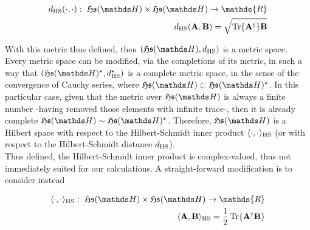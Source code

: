 \documentclass{homework}
\begin{document}
\begin{equation*}
\begin{split}
   d_{\textnormal{HS}}(\cdot, \cdot): \blanky \mathfrak{H}\mathfrak{s}(\hilbert) \times \mathfrak{H}\mathfrak{s}(\hilbert) \rightarrow \mathds{R} \\
   d_{\textnormal{HS}}({\bf A}, {\bf B}) = \sqrt{\Tr {\bf A^\dagger}{\bf B}}
\end{split}
\end{equation*}

With this metric thus defined, then $(\mathfrak{H}\mathfrak{s}(\hilbert), d_{\textnormal{HS}})$ is a metric space. Every metric space can be modified, via the completions of its metric, in such a way that 
$(\mathfrak{H}\mathfrak{s}(\hilbert)^{\star}, d_{\textnormal{HS}}^{\star})$ is a complete metric space, in the sense of the convergence of Cauchy series, where $\mathfrak{H}\mathfrak{s}(\hilbert) \subset \mathfrak{H}\mathfrak{s}(\hilbert)^{\star}$. In this particular case, given that the metric over $\mathfrak{H}\mathfrak{s}(\hilbert)$ is always a finite number -having removed those elements with infinite trace-, then it is already complete $\mathfrak{H}\mathfrak{s}(\hilbert) \sim \mathfrak{H}\mathfrak{s}(\hilbert)^{\star}$. Therefore, $\mathfrak{H}\mathfrak{s}(\hilbert)$ is a Hilbert space with respect to the Hilbert-Schmidt inner product $\langle \cdot , \cdot \rangle_{\textnormal{HS}}$ (or with respect to the Hilbert-Schmidt distance $d_{\textnormal{HS}}$). \\

Thus defined, the Hilbert-Schmidt inner product is complex-valued, thus not immediately suited for our calculations. A straight-forward modification is to consider instead 

\begin{align*}
\langle \cdot , \cdot \rangle_{\textnormal{HS}}: \blanky \mathfrak{H}\mathfrak{s}(\hilbert) \times \mathfrak{H}\mathfrak{s}(\hilbert) \rightarrow \mathds{R} \\
\langle {\bf A}, {\bf B} \rangle_{\textnormal{HS}} = \frac{1}{2}\Tr \bf \{A^\dagger {\bf B}\}
\end{align*}



\clearpage
\end{document}
